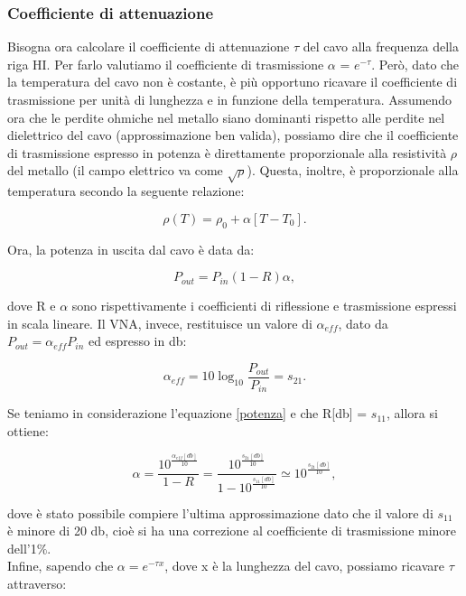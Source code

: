 \subsubsection{Coefficiente di attenuazione}
\label{ssec:Coefficiente di attenuazione}

Bisogna ora calcolare il coefficiente di attenuazione $\tau$ del cavo alla frequenza della riga HI. Per farlo valutiamo il coefficiente di trasmissione $\alpha$ = $e^{-\tau}$. Però, dato che la temperatura del cavo non è costante, è più opportuno ricavare il coefficiente di trasmissione per unità di lunghezza e in funzione della temperatura. Assumendo ora che le perdite ohmiche nel metallo siano dominanti rispetto alle perdite nel dielettrico del cavo (approssimazione ben valida), possiamo dire che il coefficiente di trasmissione espresso in potenza è direttamente proporzionale alla resistività $\rho$ del metallo (il campo elettrico va come $\sqrt{\rho}$). Questa, inoltre, è proporzionale alla temperatura secondo la seguente relazione:

\begin{equation}
    \rho(T)=\rho_{0}+\alpha[T-T_{0}].
\end{equation}

Ora, la potenza in uscita dal cavo è data da:

\begin{equation}
    P_{out}=P_{in}(1-R)\alpha,
    \label{potenza}
\end{equation}

dove R e $\alpha$ sono rispettivamente i coefficienti di riflessione e trasmissione espressi in scala lineare. 
Il VNA, invece, restituisce un valore di $\alpha_{eff}$, dato da $P_{out}=\alpha_{eff}P_{in}$ ed espresso in db:

\begin{equation}
    \alpha_{eff}=10\log_{10}\frac{P_{out}}{P_{in}}=s_{21}.
\end{equation}

Se teniamo in considerazione l'equazione \eqref{potenza} e che R[db] 
=  $s_{11}$, allora si ottiene:

\begin{equation}
    \alpha=\frac{10^{\frac{\alpha_{eff}[db]}{10}}}{1-R}=\frac{10^{\frac{s_{21}[db]}{10}}}{1-10^{\frac{s_{11}[db]}{10}}}\simeq10^{\frac{s_{21}[db]}{10}},
\end{equation}

dove è stato possibile compiere l'ultima approssimazione dato che il valore di $s_{11}$ è minore di 20 db, cioè si ha una correzione al coefficiente di trasmissione minore dell'1$\%$.\\
Infine, sapendo che $\alpha = e^{-\tau x}$, dove x è la lunghezza del cavo, possiamo ricavare $\tau$ attraverso:

